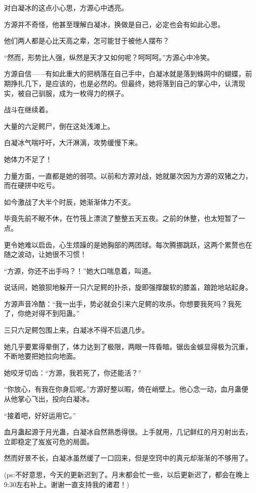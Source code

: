 \begin{this_body}
对白凝冰的这点小心思，方源心中透亮。

方源并不奇怪，他甚至理解白凝冰，换做是自己，必定也会有如此心思。

他们两人都是心比天高之辈，怎可能甘于被他人摆布？

“然而，形势比人强，纵然是天才又如何呢？呵呵呵。”方源心中冷笑。

方源自信——有如此重大的把柄落在自己手中，白凝冰就是落到蛛网中的蝴蝶，前期挣扎几下，是应该的，也是必然的。但最终，她将落到自己的掌心中，认清现实，被自己驯服，成为一枚得力的棋子。

战斗在继续着。

大量的六足鳄尸，倒在这处浅滩上。

白凝冰气喘吁吁，大汗淋漓，攻势缓慢下来。

她体力不足了！

力量方面，一直都是她的弱项。以前和方源对战，她就屡次因为方源的双猪之力，而在硬拼中吃亏。

如今激战了大半个时辰，她渐渐体力不支。

毕竟先前不眠不休，在竹筏上漂流了整整五天五夜。之前的休整，也太短暂了一点。

更令她难以启齿，心生烦躁的是她胸部的两团球。每次腾挪跳跃，这两个累赘也在随之波动，让她很不习惯！

“方源，你还不出手吗？！”她大口喘息着，叫道。

说话间，她狼狈地躲开一只六足鳄的扑杀，旋即强撑酸软的膝盖，踉跄地站起身。

方源声音冷酷：“我一出手，势必就会引来六足鳄的攻杀。你想要我死吗？我死了，你绝对得不到阳蛊。”

三只六足鳄包围上来，白凝冰不得不后退几步。

她几乎要累得晕倒了，体力达到了极限，两眼一阵昏暗。锯齿金蜈显得极为沉重，不断地要把她拉向地面。

她咬牙切齿：“方源，我若死了，你还能活？”

“你放心，有我在你身后呢。”方源好整以暇，倚在峭壁上。他心念一动，血月蛊便从他掌心飞出，投向白凝冰。

“接着吧，好好运用它。”

血月蛊起源于月光蛊，白凝冰自然熟悉得很。上手就用，几记鲜红的月刃射出去，立即稳定了岌岌可危的局面。

然而好景不长，白凝冰虽然缓了一口回来，但是空窍中的真元却渐渐的不够用了。

(ps:不好意思，今天的更新迟到了。月末都会忙一些，以后更新迟了，都会在晚上9:30左右补上。谢谢一直支持我的诸君！)

\end{this_body}

